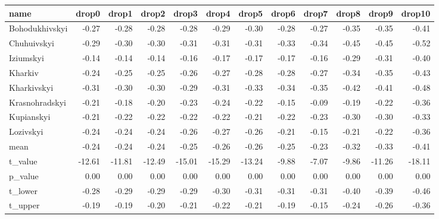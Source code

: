 \begin{table}[ht]
\centering
\begin{tabular}{lrrrrrrrrrrr}
  \hline
name & drop0 & drop1 & drop2 & drop3 & drop4 & drop5 & drop6 & drop7 & drop8 & drop9 & drop10 \\ 
  \hline
Bohodukhivskyi & -0.27 & -0.28 & -0.28 & -0.28 & -0.29 & -0.30 & -0.28 & -0.27 & -0.35 & -0.35 & -0.41 \\ 
  Chuhuivskyi & -0.29 & -0.30 & -0.30 & -0.31 & -0.31 & -0.31 & -0.33 & -0.34 & -0.45 & -0.45 & -0.52 \\ 
  Iziumskyi & -0.14 & -0.14 & -0.14 & -0.16 & -0.17 & -0.17 & -0.17 & -0.16 & -0.29 & -0.31 & -0.40 \\ 
  Kharkiv & -0.24 & -0.25 & -0.25 & -0.26 & -0.27 & -0.28 & -0.28 & -0.27 & -0.34 & -0.35 & -0.43 \\ 
  Kharkivskyi & -0.31 & -0.30 & -0.30 & -0.29 & -0.31 & -0.33 & -0.34 & -0.35 & -0.42 & -0.41 & -0.48 \\ 
  Krasnohradskyi & -0.21 & -0.18 & -0.20 & -0.23 & -0.24 & -0.22 & -0.15 & -0.09 & -0.19 & -0.22 & -0.36 \\ 
  Kupianskyi & -0.21 & -0.22 & -0.22 & -0.22 & -0.22 & -0.21 & -0.22 & -0.23 & -0.30 & -0.30 & -0.33 \\ 
  Lozivskyi & -0.24 & -0.24 & -0.24 & -0.26 & -0.27 & -0.26 & -0.21 & -0.15 & -0.21 & -0.22 & -0.36 \\ 
  mean & -0.24 & -0.24 & -0.24 & -0.25 & -0.26 & -0.26 & -0.25 & -0.23 & -0.32 & -0.33 & -0.41 \\ 
  t\_value & -12.61 & -11.81 & -12.49 & -15.01 & -15.29 & -13.24 & -9.88 & -7.07 & -9.86 & -11.26 & -18.11 \\ 
  p\_value & 0.00 & 0.00 & 0.00 & 0.00 & 0.00 & 0.00 & 0.00 & 0.00 & 0.00 & 0.00 & 0.00 \\ 
  t\_lower & -0.28 & -0.29 & -0.29 & -0.29 & -0.30 & -0.31 & -0.31 & -0.31 & -0.40 & -0.39 & -0.46 \\ 
  t\_upper & -0.19 & -0.19 & -0.20 & -0.21 & -0.22 & -0.21 & -0.19 & -0.15 & -0.24 & -0.26 & -0.36 \\ 
   \hline
\end{tabular}
\end{table}
